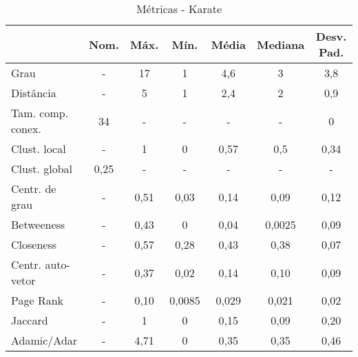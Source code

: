 \documentclass[12pt,a4paper]{article}
\begin{document}
	\begin{table}[H]
		\caption{Métricas - Karate}
		\label{tab:karete}
		\centering
		\begin{tabular}{l|c|c|c|c|c|c}
			& \textbf{Nom.} & \textbf{Máx.} & \textbf{Mín.} & \textbf{Média} & \textbf{Mediana} & \textbf{Desv. Pad.} \\ \hline
			Grau              & -                                 & 17            & 1             & 4,6             & 3                & 3,8                \\ \hline
			Distância         & -                                 & 5             & 1             & 2,4             & 2                & 0,9                \\ \hline
			Tam. comp. conex.  & 34                                 & -            & -           & -              & -               & 0                  \\ \hline
			Clust. local      & -                                 & 1             & 0             & 0,57            & 0,5              & 0,34               \\ \hline
			Clust. global     & 0,25                              & -             & -             & -               & -                & -                  \\ \hline
			Centr. de grau    & -                                 & 0,51          & 0,03          & 0,14            & 0,09             & 0,12               \\ \hline
			Betweeness        & -                                 & 0,43          & 0             & 0,04            & 0,0025           & 0,09               \\ \hline
			Closeness         & -                                 & 0,57          & 0,28          & 0,43            & 0,38             & 0,07               \\ \hline
			Centr. auto-vetor & -                                 & 0,37          & 0,02          & 0,14            & 0,10             & 0,09               \\ \hline
			Page Rank         & -                                 & 0,10          & 0,0085        & 0,029           & 0,021            & 0,02               \\ \hline
			Jaccard           & -                                 & 1             & 0             & 0,15            & 0,09             & 0,20               \\ \hline
			Adamic/Adar       & -                                 & 4,71          & 0             & 0,35            & 0,35             & 0,46              
		\end{tabular}
	\end{table}
		
\end{document}
